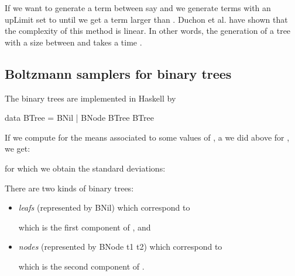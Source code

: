 \documentclass{sig-alternate}
\begin{document}
\begin{figure*}[!t]
If we want to generate a term between say  and  we generate terms with an
\<upLimit\> set to  until we get a term larger than .  Duchon et al. have shown
that the complexity of this method is linear. In other words, the generation of a
tree with a size between  and  takes a time .


\subsection{Boltzmann samplers for binary trees}
The binary trees are implemented in \textsf{Haskell} by
\begin{haskell}
  data BTree = BNil | BNode BTree BTree
\end{haskell}
If we compute for  the means associated to some values of , a we did above
for , we get:

for which we obtain the standard deviations:

There are two kinds of binary trees:
\begin{itemize}
\item \emph{leafs} (represented by \<BNil\>) which correspond to
  
which is the first component of ,
  and
\item \emph{nodes} (represented by \<BNode t1 t2\>) which correspond to
  
which is the
  second component of .
\end{itemize}


\end{figure*}
\end{document}
